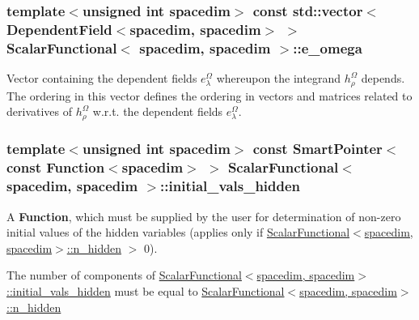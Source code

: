 \subsubsection[{\texorpdfstring{e\+\_\+omega}{e_omega}}]{\setlength{\rightskip}{0pt plus 5cm}template$<$unsigned int spacedim$>$ const std\+::vector$<${\bf Dependent\+Field}$<$spacedim, spacedim$>$ $>$ {\bf Scalar\+Functional}$<$ spacedim, spacedim $>$\+::e\+\_\+omega}\hypertarget{class_scalar_functional_3_01spacedim_00_01spacedim_01_4_adfed9b70b743ba245a39c3e63b951f96}{}\label{class_scalar_functional_3_01spacedim_00_01spacedim_01_4_adfed9b70b743ba245a39c3e63b951f96}
Vector containing the dependent fields $e^\Omega_\lambda$ whereupon the integrand $h^\Omega_\rho$ depends. The ordering in this vector defines the ordering in vectors and matrices related to derivatives of $h^\Omega_\rho$ w.\+r.\+t. the dependent fields $e^\Omega_\lambda$. 
\subsubsection[{\texorpdfstring{initial\+\_\+vals\+\_\+hidden}{initial_vals_hidden}}]{\setlength{\rightskip}{0pt plus 5cm}template$<$unsigned int spacedim$>$ const {\bf Smart\+Pointer}$<$const {\bf Function}$<$spacedim$>$ $>$ {\bf Scalar\+Functional}$<$ spacedim, spacedim $>$\+::initial\+\_\+vals\+\_\+hidden}\hypertarget{class_scalar_functional_3_01spacedim_00_01spacedim_01_4_ae3282d5182360e0030e4cc5e02fbe2eb}{}\label{class_scalar_functional_3_01spacedim_00_01spacedim_01_4_ae3282d5182360e0030e4cc5e02fbe2eb}
A {\bf Function}, which must be supplied by the user for determination of non-\/zero initial values of the hidden variables (applies only if \hyperlink{class_scalar_functional_3_01spacedim_00_01spacedim_01_4_a7df6711471715f907bc9911449c5c825}{Scalar\+Functional$<$spacedim, spacedim$>$\+::n\+\_\+hidden} $>$ 0).

The number of components of \hyperlink{class_scalar_functional_3_01spacedim_00_01spacedim_01_4_ae3282d5182360e0030e4cc5e02fbe2eb}{Scalar\+Functional$<$spacedim, spacedim$>$\+::initial\+\_\+vals\+\_\+hidden} must be equal to \hyperlink{class_scalar_functional_3_01spacedim_00_01spacedim_01_4_a7df6711471715f907bc9911449c5c825}{Scalar\+Functional$<$spacedim, spacedim$>$\+::n\+\_\+hidden}


